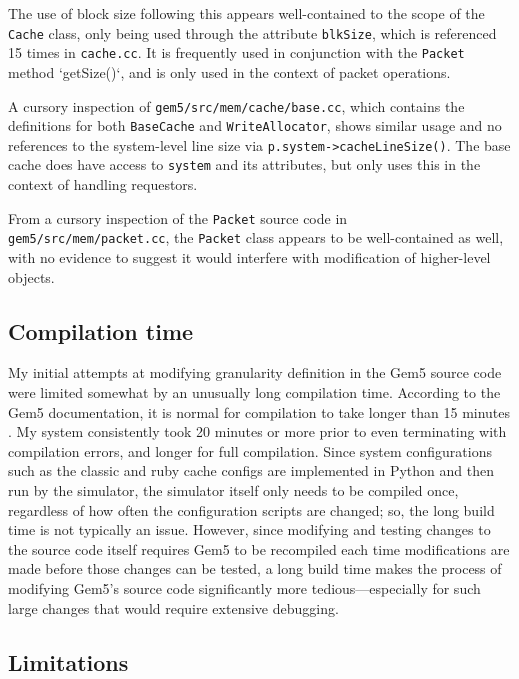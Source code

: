 \documentclass[12pt,twoside]{reedthesis}
\begin{document}
	The use of block size following this appears well-contained to the scope of the \verb`Cache` class, only being used through the attribute \verb`blkSize`, which is referenced 15 times in \verb`cache.cc`. It is frequently used in conjunction with the \verb`Packet` method `getSize()`, and is only used in the context of packet operations.
	
	A cursory inspection of \verb`gem5/src/mem/cache/base.cc`, which contains the definitions for both \verb`BaseCache` and \verb`WriteAllocator`, shows similar usage and no references to the system-level line size via \verb`p.system->cacheLineSize()`. The base cache does have access to \verb`system` and its attributes, but only uses this in the context of handling requestors.
	
	From a cursory inspection of the \verb`Packet` source code in \verb`gem5/src/mem/packet.cc`, the \verb`Packet` class appears to be well-contained as well, with no evidence to suggest it would interfere with modification of higher-level objects.

	\subsection*{Compilation time}

	My initial attempts at modifying granularity definition in the Gem5 source code were limited somewhat by an unusually long compilation time. According to the Gem5 documentation, it is normal for compilation to take longer than 15 minutes \cite{gem5-build}. My system consistently took 20 minutes or more prior to even terminating with compilation errors, and longer for full compilation. Since system configurations such as the classic and ruby cache configs are implemented in Python and then run by the simulator, the simulator itself only needs to be compiled once, regardless of how often the configuration scripts are changed; so, the long build time is not typically an issue. However, since modifying and testing changes to the source code itself requires Gem5 to be recompiled each time modifications are made before those changes can be tested, a long build time makes the process of modifying Gem5's source code significantly more tedious---especially for such large changes that would require extensive debugging.

	\subsection*{Limitations}
\end{document}
